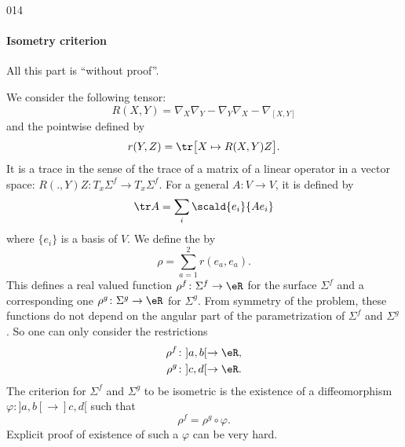 \begin{corrige}{014}
\paragraph{Isometry criterion} All this part is ``without proof''.

We consider the following tensor:
\[ 
  R(X,Y)=\nabla_X\nabla_Y-\nabla_Y\nabla_X-\nabla_{[X,Y]}
\]
and the  pointwise defined by
\[ 
  r(Y,Z)=\tr\big[ X\mapsto R(X,Y)Z \big].
\]
It is a trace in the sense of the trace of a matrix of a linear operator in a vector space: $R(.,Y)Z\colon T_x\Sigma^f\to T_x\Sigma^f$. For a general $A\colon V\to V$, it is defined by
\[ 
  \tr A=\sum_i\scald{ e_i }{ Ae_i }
\]
where $\{ e_i \}$ is a basis of $V$. We define the  by
\[ 
  \rho=\sum_{a=1}^2r(e_a,e_a).
\]
This defines a real valued function $\rho^f\colon \Sigma^f\to \eR$  for the surface $\Sigma^f$ and a corresponding one $\rho^g\colon \Sigma^g\to \eR$ for $\Sigma^g$. From symmetry of the problem, these functions do not depend on the angular part of the parametrization of $\Sigma^f$ and $\Sigma^g$. So one can only consider the restrictions
\begin{subequations}
\begin{align}
\rho^f&\colon ]a,b[\to \eR,\\
\rho^g&\colon ]c,d[\to \eR.
\end{align}
\end{subequations}
The criterion for $\Sigma^f$ and $\Sigma^g$ to be isometric is the existence of a diffeomorphism $\varphi\colon ]a,b[\to ]c,d[$ such that 
\[ 
  \rho^f=\rho^g\circ\varphi.
\]
Explicit proof of existence of such a $\varphi$ can be very hard.


\end{corrige}
